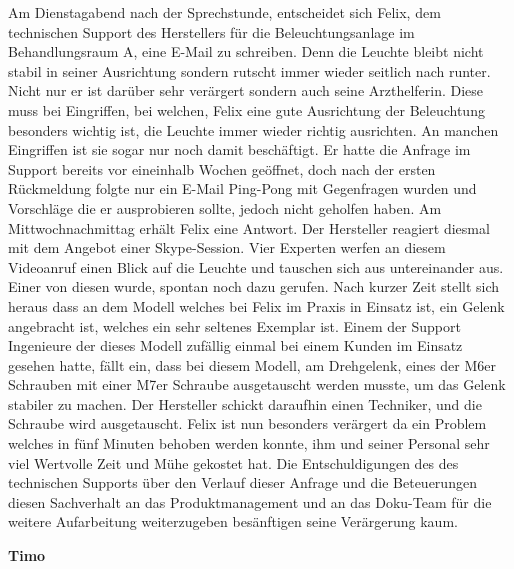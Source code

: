 Am Dienstagabend nach der Sprechstunde, entscheidet sich Felix, dem technischen Support des
Herstellers für die Beleuchtungsanlage im Behandlungsraum A, eine E-Mail zu schreiben. Denn die
Leuchte bleibt nicht stabil in seiner Ausrichtung sondern rutscht immer wieder seitlich nach runter.
Nicht nur er ist darüber sehr verärgert sondern auch seine Arzthelferin. Diese muss bei Eingriffen, bei
welchen, Felix eine gute Ausrichtung der Beleuchtung besonders wichtig ist, die Leuchte immer
wieder richtig ausrichten. An manchen Eingriffen ist sie sogar nur noch damit beschäftigt. Er hatte die
Anfrage im Support bereits vor eineinhalb Wochen geöffnet, doch nach der ersten Rückmeldung
folgte nur ein E-Mail Ping-Pong mit Gegenfragen wurden und Vorschläge die er ausprobieren sollte,
jedoch nicht geholfen haben.
Am Mittwochnachmittag erhält Felix eine Antwort. Der Hersteller reagiert diesmal mit dem Angebot
einer Skype-Session. Vier Experten werfen an diesem Videoanruf einen Blick auf die Leuchte und
tauschen sich aus untereinander aus. Einer von diesen wurde, spontan noch dazu gerufen. Nach
kurzer Zeit stellt sich heraus dass an dem Modell welches bei Felix im Praxis in Einsatz ist, ein
Gelenk angebracht ist, welches ein sehr seltenes Exemplar ist. Einem der Support Ingenieure der
dieses Modell zufällig einmal bei einem Kunden im Einsatz gesehen hatte, fällt ein, dass bei diesem
Modell, am Drehgelenk, eines der M6er Schrauben mit einer M7er Schraube ausgetauscht werden
musste, um das Gelenk stabiler zu machen. Der Hersteller schickt daraufhin einen Techniker, und die
Schraube wird ausgetauscht. Felix ist nun besonders verärgert da ein Problem welches in fünf
Minuten behoben werden konnte, ihm und seiner Personal sehr viel Wertvolle Zeit und Mühe gekostet
hat. Die Entschuldigungen des des technischen Supports über den Verlauf dieser Anfrage und die
Beteuerungen diesen Sachverhalt an das Produktmanagement und an das Doku-Team für die
weitere Aufarbeitung weiterzugeben besänftigen seine Verärgerung kaum.

\vspace{2mm}
\textbf{Timo}

